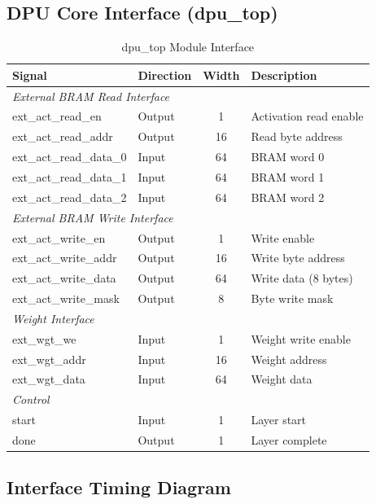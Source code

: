 \documentclass[11pt,a4paper]{article}
\begin{document}
\subsection{DPU Core Interface (dpu\_top)}

\begin{table}[H]
\centering
\caption{dpu\_top Module Interface}
\begin{tabular}{llcp{5.5cm}}
\toprule
\textbf{Signal} & \textbf{Direction} & \textbf{Width} & \textbf{Description} \\
\midrule
\multicolumn{4}{l}{\textit{External BRAM Read Interface}} \\
ext\_act\_read\_en & Output & 1 & Activation read enable \\
ext\_act\_read\_addr & Output & 16 & Read byte address \\
ext\_act\_read\_data\_0 & Input & 64 & BRAM word 0 \\
ext\_act\_read\_data\_1 & Input & 64 & BRAM word 1 \\
ext\_act\_read\_data\_2 & Input & 64 & BRAM word 2 \\
\midrule
\multicolumn{4}{l}{\textit{External BRAM Write Interface}} \\
ext\_act\_write\_en & Output & 1 & Write enable \\
ext\_act\_write\_addr & Output & 16 & Write byte address \\
ext\_act\_write\_data & Output & 64 & Write data (8 bytes) \\
ext\_act\_write\_mask & Output & 8 & Byte write mask \\
\midrule
\multicolumn{4}{l}{\textit{Weight Interface}} \\
ext\_wgt\_we & Input & 1 & Weight write enable \\
ext\_wgt\_addr & Input & 16 & Weight address \\
ext\_wgt\_data & Input & 64 & Weight data \\
\midrule
\multicolumn{4}{l}{\textit{Control}} \\
start & Input & 1 & Layer start \\
done & Output & 1 & Layer complete \\
\bottomrule
\end{tabular}
\end{table}

\subsection{Interface Timing Diagram}
\end{document}
